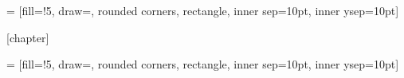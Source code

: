 = [fill=\exemplecolorfill!5,
draw=\exemplecolorborder,
rounded corners,
rectangle, inner sep=10pt, inner ysep=10pt]

\newcommand{\exemple}[2][]
{\stepcounter{exemplecounter}
	\setlength{\netlength}{\textwidth}
	\addtolength{\netlength}{-20pt}
	
	\medskip\noindent
	\begin{tikzpicture}
	\node[eboxstyle] (dbox)
	{\begin{minipage}{\netlength}
		\ifthenelse{\equal{#1}{\empty}}{\smallskip}{\medskip}
		#2
		\end{minipage}
	};
	\node at (dbox.north west) [xshift=2mm, anchor=west, fill=white, text=\exemplecolorborder, top color=white, bottom color=\exemplecolorfill!5, rounded corners]
	{\textbf{\large Exemple}
		\ifthenelse{\equal{#1}{\empty}}{}{{\large(#1)}}
	};
	\end{tikzpicture}
}

[chapter]

 = [fill=\activitycolorfill!5,
draw=\activitycolorborder,
rounded corners,
rectangle, inner sep=10pt, inner ysep=10pt]

\newcommand{\activite}[2][]
{\refstepcounter{activitycounter}
	\setlength{\netlength}{\textwidth}
	\addtolength{\netlength}{-20pt}
	
	\medskip\noindent
	\begin{tikzpicture}
	\node[aboxstyle] (dbox)
	{\begin{minipage}{\netlength}
		\ifthenelse{\equal{#1}{\empty}}{\smallskip}{\medskip}
		#2
		\end{minipage}
	};
	\node at (dbox.north west) [xshift=2mm, anchor=west, fill=white, text=\activitycolorborder, top color=white, bottom color=\activitycolorfill!5, rounded corners]
	{\textbf{\large Activité \arabic{activitycounter}}
		\ifthenelse{\equal{#1}{\empty}}{}{{\large(#1)}}
	};
	\end{tikzpicture}
}
 
 \newcommand{\rappel}[1]
 { \settowidth{\netlength}{\textbf{Rappel : }}
 	\addtolength{\netlength}{-\textwidth}
 	\par\noindent
 	\textbf{\color{\scriptcolor}Rappel : }%
 	\begin{minipage}[t]{-\netlength}
 		{#1}
 	\end{minipage}\\
 }

